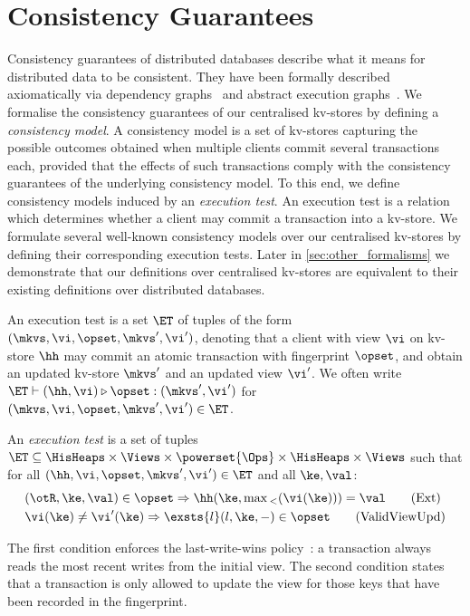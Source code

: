 \section{Consistency Guarantees}
\label{sec:cm}
Consistency guarantees of distributed databases describe
what it means for distributed data to be consistent. 
They have been formally described axiomatically via dependency graphs~\cite{adya-icde,adya}
and abstract execution graphs~\cite{ev_transactions,framework-concur}. 
We formalise the consistency guarantees of our centralised kv-stores by defining a 
\emph{consistency model}. 
A consistency model is a set of kv-stores capturing the possible outcomes 
obtained when multiple clients commit several transactions each, 
provided that the effects of such transactions comply with the consistency guarantees of the underlying consistency model. 
To this end, we define consistency models induced by an \emph{execution test}.
An execution test is a relation which determines whether a client may commit a transaction into a kv-store.  
We formulate several well-known consistency models over our centralised kv-stores 
by defining their corresponding execution tests. 
Later in \cref{sec:other_formalisms} we demonstrate that our definitions over centralised kv-stores are equivalent 
to their existing definitions over distributed databases.




An execution test is a set $\ET$ of tuples of the form $(\mkvs, \vi, \opset, \mkvs', \vi')$,
denoting that a client with view $\vi$ on kv-store $\hh$  may commit an atomic transaction 
with fingerprint $\opset$, and obtain an updated kv-store \( \mkvs' \) and an updated view $\vi'$. 
We often write
$\ET \vdash (\hh, \vi) \triangleright \opset: ( \mkvs', \vi')$ for
$(\mkvs, \vi, \opset, \mkvs', \vi') \in \ET$.


\begin{definition}
\label{def:execution.test}
An \emph{execution test} is a set of tuples $\ET \subseteq \HisHeaps \times \Views \times \powerset{\Ops} \times \HisHeaps \times \Views$ 
such that for all $(\hh, \vi, \opset, \mkvs', \vi') \in \ET$ and all $\ke, \val$:
\begin{align}
    & 
	(\otR, \ke, \val) \in \opset \Rightarrow
	\hh(\ke, \max{}_{<}(\vi(\ke))) = \val  
	\tag{Ext} \label{eq:read-external} \\
    & 
    \vi(\ke) \neq \vi'(\ke) 
    \Rightarrow
    \exsts{l} (l, \ke, -) \in \opset
    \tag{ValidViewUpd} \label{eq:valid-view-update}
\end{align}
\end{definition}
%
\noindent 
The first condition enforces the last-write-wins policy~\cite{vogels:2009:ec:1435417.1435432}: 
a transaction always reads the most recent writes from the initial view.  
The second condition states that a transaction is only allowed to update the view for those keys 
that have been recorded in the fingerprint.  

